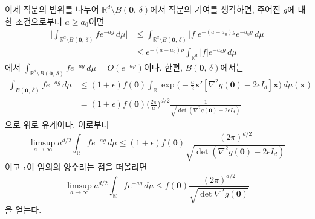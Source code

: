 \documentclass[10pt,onecolumn,twoside,a4size]{gsag3jnl}
\begin{document}
이제 적분의 범위를 나누어 $\mathbb{R}^d\setminus B(\mathbf{0},\,\delta)$에서 적분의 기여를 생각하면, 주어진 $g$에 대한 조건으로부터 $a\geq a_0$이면 
\begin{align}
  \bigg|\int_{\mathbb{R}^d\setminus B(\mathbf{0},\,\delta)}fe^{-ag}\,d\mu\bigg|&\leq\int_{\mathbb{R}^d\setminus B(\mathbf{0},\,\delta)}|f|e^{-(a-a_0)g}e^{-a_0g}\,d\mu\\
  &\leq e^{-(a-a_0)\rho}\int_{\mathbb{R}^d}|f|e^{-a_0g}\,d\mu\nonumber
\end{align}
에서 $\int_{\mathbb{R}^d\setminus B(\mathbf{0},\,\delta)}fe^{-ag}\,d\mu=O(e^{-a\rho})$이다. 한편, $B(\mathbf{0},\,\delta)$에서는
\begin{align}
  \int_{B(\mathbf{0},\,\delta)}fe^{-ag}\,d\mu&\leq(1+\epsilon)f(\mathbf{0})\int_{\mathbb{R}} \exp\bigg(-\frac{a}{2}\mathbf{x}'[\nabla^2g(\mathbf{0})-2\epsilon I_d]\mathbf{x}\bigg)\,d\mu(\mathbf{x})\nonumber\\
  &=(1+\epsilon)f(\mathbf{0})\bigg(\frac{2\pi}{a}\bigg)^{d/2}\frac{1}{\sqrt{\det(\nabla^2 g(\mathbf{0})-2\epsilon I_d)}}\nonumber
\end{align}
으로 위로 유계이다. 이로부터
\begin{equation}
  \limsup_{a\to\infty}a^{d/2}\int_{\mathbb{R}}fe^{-ag}\,d\mu\leq(1+\epsilon)f(\mathbf{0})\frac{(2\pi)^{d/2}}{\sqrt{\det(\nabla^2 g(\mathbf{0})-2\epsilon I_d)}}\nonumber
\end{equation}
이고 $\epsilon$이 임의의 양수라는 점을 떠올리면
\begin{equation}\label{eq:limsup}
  \limsup_{a\to\infty}a^{d/2}\int_{\mathbb{R}}fe^{-ag}\,d\mu\leq f(\mathbf{0})\frac{(2\pi)^{d/2}}{\sqrt{\det\nabla^2 g(\mathbf{0})}}
\end{equation}
을 얻는다.
\end{document}
